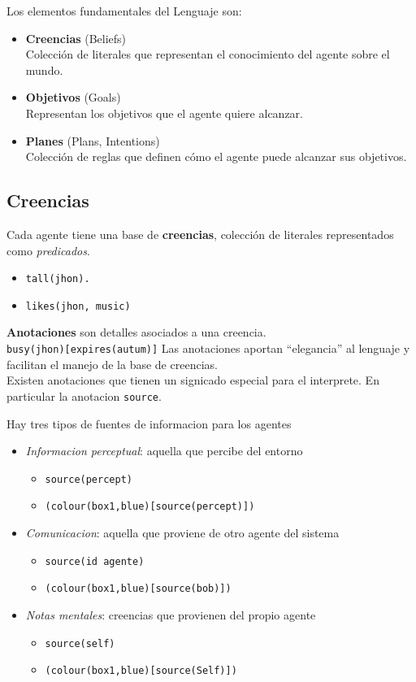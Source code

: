 {Los elementos fundamentales del Lenguaje son:\ns
\begin{itemize}
	\item \textbf{Creencias} (Beliefs)\\ 
   Colección de literales que representan el conocimiento del agente sobre el mundo.
	\item \textbf{Objetivos} (Goals)\\ 
   Representan los objetivos que el agente quiere alcanzar.
	\item \textbf{Planes} (Plans, Intentions)\\ 
   Colección de reglas que definen cómo el agente puede alcanzar sus objetivos.
\end{itemize} }


\subsection{Creencias}
{Cada agente tiene una base de \textbf{creencias}, colección de literales representados como \textit{predicados}.\ns
\begin{itemize}
	\item \lstinline|tall(jhon).|
	\item \lstinline|likes(jhon, music)|
\end{itemize}}
\textbf{Anotaciones} son detalles asociados a una creencia.\\\lstinline|busy(jhon)[expires(autum)]|
Las anotaciones aportan ``elegancia'' al lenguaje y facilitan el manejo de la base de creencias.\\
Existen anotaciones que tienen un signicado especial para el
interprete. En particular la anotacion \lstinline|source|.

Hay tres tipos de fuentes de informacion para los agentes
\begin{itemize}
	\item \textit{Informacion perceptual}: aquella que percibe del entorno
	      \begin{itemize}
		      \item \lstinline|source(percept)|
		      \item \lstinline|(colour(box1,blue)[source(percept)])|
	      \end{itemize}
	\item \textit{Comunicacion}: aquella que proviene de otro agente del
	      sistema
	      \begin{itemize}
		      \item \lstinline|source(id agente)|
		      \item \lstinline|(colour(box1,blue)[source(bob)])|
	      \end{itemize}
	\item \textit{Notas mentales}: creencias que provienen del propio agente
	      \begin{itemize}
		      \item \lstinline|source(self)|
		      \item \lstinline|(colour(box1,blue)[source(Self)])|
	      \end{itemize}
\end{itemize}

